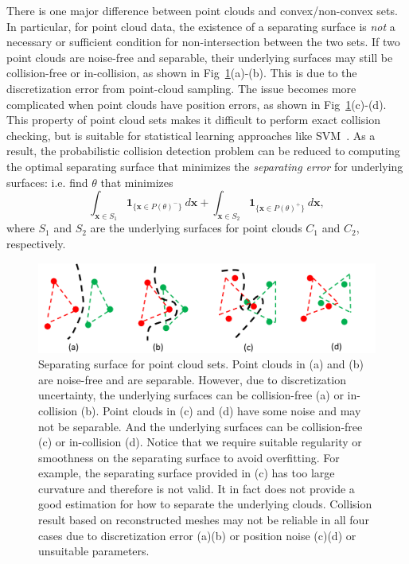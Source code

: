 There is one major difference between point clouds and convex/non-convex sets. In particular, for point cloud data, the existence of a separating surface is \emph{not} a necessary or sufficient condition for non-intersection between the two sets. If two point clouds are noise-free and separable, their underlying surfaces may still be collision-free or in-collision, as shown in Fig~\ref{fig:7:separating-point}(a)-(b). This is due to the discretization error from point-cloud sampling. The issue becomes more complicated when point clouds have position errors, as shown in Fig~\ref{fig:7:separating-point}(c)-(d).
This property of point cloud sets makes it difficult to perform exact collision checking, but is suitable for statistical learning approaches like SVM~\cite{Bi:2005}. As a result, the probabilistic collision detection problem can be reduced to computing the optimal separating surface that minimizes the \emph{separating error}
for underlying surfaces: i.e. find $\theta$ that minimizes
\begin{equation}
\label{eq:7:error}
\int_{\mathbf x \in S_1} \mathbf{1}_{\{\mathbf x \in P(\theta)^-\}} \ d\mathbf x + \int_{\mathbf x \in S_2} \mathbf{1}_{\{\mathbf x \in P(\theta)^+\}} \ d\mathbf x,
\end{equation}
where $S_1$ and $S_2$ are the underlying surfaces for point clouds $C_1$ and $C_2$, respectively.


\begin{figure}[htb]
  \centering
  \includegraphics[width=0.9\linewidth]{figs/7/separating-point.pdf}
  \caption[Separating surface for point cloud sets]{\label{fig:7:separating-point} Separating surface for point cloud sets. Point clouds in (a) and (b) are noise-free and are separable. However, due to discretization uncertainty, the underlying surfaces can be
  collision-free (a) or in-collision (b). Point clouds in (c) and (d) have some noise and may not be separable. And the underlying surfaces can be collision-free (c) or in-collision (d). Notice that we require suitable regularity or smoothness on the separating surface to avoid overfitting. For example, the separating surface provided in (c) has too large curvature and therefore is not valid. It in fact does not provide a good estimation for how to separate the underlying clouds. Collision result based on reconstructed meshes may not be reliable in all four cases due to discretization error (a)(b) or position noise (c)(d) or unsuitable parameters.}
\end{figure}


